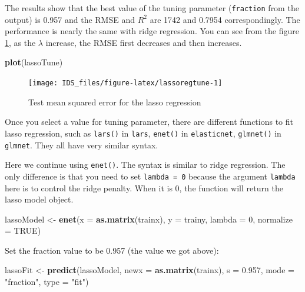 \documentclass[12pt,]{krantz}
\makeatletter
\newenvironment{Shaded}{\begin{snugshade}}{\end{snugshade}}
\newcommand{\DataTypeTok}[1]{\textcolor[rgb]{0.27,0.27,0.27}{#1}}
\newcommand{\DecValTok}[1]{\textcolor[rgb]{0.06,0.06,0.06}{#1}}
\newcommand{\FloatTok}[1]{\textcolor[rgb]{0.06,0.06,0.06}{#1}}
\newcommand{\KeywordTok}[1]{\textcolor[rgb]{0.27,0.27,0.27}{\textbf{#1}}}
\newcommand{\NormalTok}[1]{#1}
\newcommand{\OtherTok}[1]{\textcolor[rgb]{0.37,0.37,0.37}{#1}}
\newcommand{\StringTok}[1]{\textcolor[rgb]{0.5,0.5,0.5}{#1}}
\newenvironment{kframe}{%
\medskip{}
\setlength{\fboxsep}{.8em}
 \def\at@end@of@kframe{}%
 \ifinner\ifhmode%
  \def\at@end@of@kframe{\end{minipage}}%
  \begin{minipage}{\columnwidth}%
 \fi\fi%
 \def\FrameCommand##1{\hskip\@totalleftmargin \hskip-\fboxsep
 \colorbox{shadecolor}{##1}\hskip-\fboxsep
     \hskip-\linewidth \hskip-\@totalleftmargin \hskip\columnwidth}%
 \MakeFramed {\advance\hsize-\width
   \@totalleftmargin\z@ \linewidth\hsize
   \@setminipage}}%
 {\par\unskip\endMakeFramed%
 \at@end@of@kframe}
\renewenvironment{Shaded}{\begin{kframe}}{\end{kframe}}
\makeatother
\begin{document}
The results show that the best value of the tuning parameter (\texttt{fraction} from the output) is 0.957 and the RMSE and \(R^{2}\) are 1742 and 0.7954 correspondingly. The performance is nearly the same with ridge regression. You can see from the figure \ref{fig:lassoregtune}, as the \(\lambda\) increase, the RMSE first decreases and then increases.

\begin{Shaded}
\begin{Highlighting}[]
\KeywordTok{plot}\NormalTok{(lassoTune)}
\end{Highlighting}
\end{Shaded}

\begin{figure}

{\centering \texttt{[image: IDS\_files/figure-latex/lassoregtune-1]} 

}

\caption{Test mean squared error for the lasso regression}\label{fig:lassoregtune}
\end{figure}

Once you select a value for tuning parameter, there are different functions to fit lasso regression, such as \texttt{lars()} in \texttt{lars}, \texttt{enet()} in \texttt{elasticnet}, \texttt{glmnet()} in \texttt{glmnet}. They all have very similar syntax.

Here we continue using \texttt{enet()}. The syntax is similar to ridge regression. The only difference is that you need to set \texttt{lambda\ =\ 0} because the argument \texttt{lambda} here is to control the ridge penalty. When it is 0, the function will return the lasso model object.

\begin{Shaded}
\begin{Highlighting}[]
\NormalTok{lassoModel <-}\StringTok{ }\KeywordTok{enet}\NormalTok{(}\DataTypeTok{x =} \KeywordTok{as.matrix}\NormalTok{(trainx), }\DataTypeTok{y =}\NormalTok{ trainy, }
                   \DataTypeTok{lambda =} \DecValTok{0}\NormalTok{, }\DataTypeTok{normalize =} \OtherTok{TRUE}\NormalTok{)}
\end{Highlighting}
\end{Shaded}

Set the fraction value to be 0.957 (the value we got above):

\begin{Shaded}
\begin{Highlighting}[]
\NormalTok{lassoFit <-}\StringTok{ }\KeywordTok{predict}\NormalTok{(lassoModel, }\DataTypeTok{newx =} \KeywordTok{as.matrix}\NormalTok{(trainx), }
                    \DataTypeTok{s =} \FloatTok{0.957}\NormalTok{, }\DataTypeTok{mode =} \StringTok{"fraction"}\NormalTok{, }\DataTypeTok{type =} \StringTok{"fit"}\NormalTok{)}
\end{Highlighting}
\end{Shaded}
\end{document}
